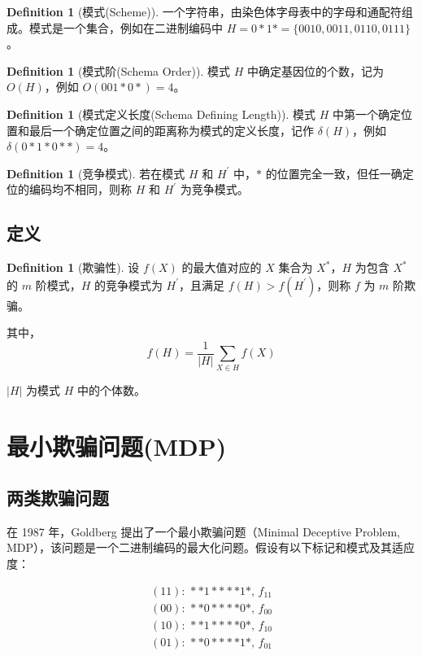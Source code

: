 \documentclass[journal=gmj]{report}%
\theoremstyle{definition}
\newtheorem{definition}[theorem]{Definition}
\numberwithin{equation}{section}
\begin{document}
\begin{definition}[模式(Scheme)]
   一个字符串，由染色体字母表中的字母和通配符组成。模式是一个集合，例如在二进制编码中 $H = 0*1* = \{0010, 0011, 0110, 0111\}$。
\end{definition}

\begin{definition}[模式阶(Schema Order)]
    模式 $H$ 中确定基因位的个数，记为 $O(H)$，例如 $O(001*0*) = 4$。
\end{definition}

\begin{definition}[模式定义长度(Schema Defining Length)]
    模式 $H$ 中第一个确定位置和最后一个确定位置之间的距离称为模式的定义长度，记作 $\delta(H)$，例如 $\delta(0*1*0**) = 4$。
\end{definition}

\begin{definition}[竞争模式]
    若在模式 $H$ 和 $H^\prime$ 中，$*$ 的位置完全一致，但任一确定位的编码均不相同，则称 $H$ 和 $H^\prime$ 为竞争模式。
\end{definition}

\subsection{定义}

\begin{definition}[欺骗性]
    设 $f(X)$ 的最大值对应的 $X$ 集合为 $X^*$，$H$ 为包含 $X^*$ 的 $m$ 阶模式，$H$ 的竞争模式为 $H^\prime$，且满足 $f(H) > f(H^\prime)$，则称 $f$ 为 $m$ 阶欺骗。

    其中，
    $$
    f(H) = \frac{1}{|H|}\sum\limits_{X\in H} f(X)
    $$

    $|H|$ 为模式 $H$ 中的个体数。
\end{definition}

\section{最小欺骗问题(MDP)}

\subsection{两类欺骗问题}

在 1987 年，Goldberg \cite{goldberg1987deceptive} 提出了一个最小欺骗问题（Minimal Deceptive Problem, MDP），该问题是一个二进制编码的最大化问题。假设有以下标记和模式及其适应度：

$$
\begin{array}{c}
    (11):\, **1****1*, \, f_{11} \\
    (00):\, **0****0*, \, f_{00} \\
    (10):\, **1****0*, \, f_{10} \\
    (01):\, **0****1*, \, f_{01}
\end{array}
$$
\end{document}
